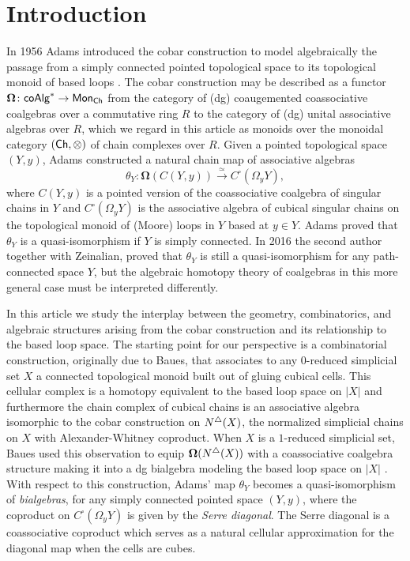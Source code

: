\section{Introduction}
In 1956 Adams introduced the cobar construction to model algebraically the passage from a simply connected pointed topological space to its topological monoid of based loops \cite{Adams}. The cobar construction may be described as a functor $\mathbf{\Omega} \colon \mathsf{coAlg}^* \to \mathsf{Mon}_{\mathsf{Ch}}$ from the category of (dg) coaugemented coassociative coalgebras over a commutative ring $R$ to the category of (dg) unital associative algebras over $R$, which we regard in this article as monoids over the monoidal category $(\mathsf{Ch}, \otimes) $ of chain complexes over $R$. Given a pointed topological space $(Y,y)$, Adams constructed a natural chain map of associative algebras
$$\theta_Y \colon \mathbf{\Omega}(C(Y,y)) \xrightarrow{\simeq} C^{\square}(\Omega_yY),$$ where $C(Y,y)$ is a pointed version of the coassociative coalgebra of singular chains in $Y$ and $C^{\square}(\Omega_yY)$ is the associative algebra of cubical singular chains on the topological monoid of (Moore) loops in $Y$ based at $y \in Y$. Adams proved that $\theta_Y$ is a quasi-isomorphism if $Y$ is simply connected. In 2016 the second author together with Zeinalian, proved that $\theta_Y$ is still a quasi-isomorphism for any path-connected space $Y$, but the algebraic homotopy theory of coalgebras in this more general case must be interpreted differently.

In this article we study the interplay between the geometry, combinatorics, and algebraic structures arising from the cobar construction and its relationship to the based loop space. The starting point for our perspective is a combinatorial construction, originally due to Baues, that associates to any $0$-reduced simplicial set $X$ a connected topological monoid built out of gluing cubical cells.  This cellular complex is a homotopy equivalent to the based loop space on $|X|$ and furthermore the chain complex of cubical chains is an associative algebra isomorphic to the cobar construction on $N^{\triangle}(X)$, the normalized simplicial chains on $X$ with Alexander-Whitney coproduct. When $X$ is a $1$-reduced simplicial set, Baues used this observation to equip $\mathbf{\Omega}( N^{\triangle} (X) )$ with a coassociative coalgebra structure making it into a dg bialgebra modeling the based loop space on $|X|$ \cite{Baues}.  With respect to this construction, Adams' map $\theta_Y$ becomes a quasi-isomorphism of \textit{bialgebras}, for any simply connected pointed space $(Y,y)$, where the coproduct on $C^{\square}(\Omega_yY)$ is given by the \textit{Serre diagonal}. The Serre diagonal is a coassociative coproduct which serves as a natural cellular approximation for the diagonal map when the cells are cubes. 

